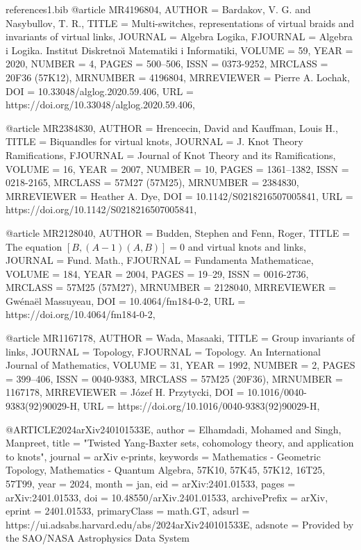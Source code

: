 \documentclass[11pt, reqno]{amsart}
\theoremstyle{definition}
\begin{document}
\begin{filecontents*}[overwrite]{references1.bib}
@article {MR4196804,
	AUTHOR = {Bardakov, V. G. and Nasybullov, T. R.},
	TITLE = {Multi-switches, representations of virtual braids and
		invariants of virtual links},
	JOURNAL = {Algebra Logika},
	FJOURNAL = {Algebra i Logika. Institut Diskretno\u{\i} Matematiki i
		Informatiki},
	VOLUME = {59},
	YEAR = {2020},
	NUMBER = {4},
	PAGES = {500--506},
	ISSN = {0373-9252},
	MRCLASS = {20F36 (57K12)},
	MRNUMBER = {4196804},
	MRREVIEWER = {Pierre A. Lochak},
	DOI = {10.33048/alglog.2020.59.406},
	URL = {https://doi.org/10.33048/alglog.2020.59.406},
}

@article {MR2384830,
    AUTHOR = {Hrencecin, David and Kauffman, Louis H.},
     TITLE = {Biquandles for virtual knots},
   JOURNAL = {J. Knot Theory Ramifications},
  FJOURNAL = {Journal of Knot Theory and its Ramifications},
    VOLUME = {16},
      YEAR = {2007},
    NUMBER = {10},
     PAGES = {1361--1382},
      ISSN = {0218-2165},
   MRCLASS = {57M27 (57M25)},
  MRNUMBER = {2384830},
MRREVIEWER = {Heather A. Dye},
       DOI = {10.1142/S0218216507005841},
       URL = {https://doi.org/10.1142/S0218216507005841},
}

@article {MR2128040,
	AUTHOR = {Budden, Stephen and Fenn, Roger},
	TITLE = {The equation {$[B,(A-1)(A,B)]=0$} and virtual knots and links},
	JOURNAL = {Fund. Math.},
	FJOURNAL = {Fundamenta Mathematicae},
	VOLUME = {184},
	YEAR = {2004},
	PAGES = {19--29},
	ISSN = {0016-2736},
	MRCLASS = {57M25 (57M27)},
	MRNUMBER = {2128040},
	MRREVIEWER = {Gw\'{e}na\"{e}l Massuyeau},
	DOI = {10.4064/fm184-0-2},
	URL = {https://doi.org/10.4064/fm184-0-2},
}

@article {MR1167178,
	AUTHOR = {Wada, Masaaki},
	TITLE = {Group invariants of links},
	JOURNAL = {Topology},
	FJOURNAL = {Topology. An International Journal of Mathematics},
	VOLUME = {31},
	YEAR = {1992},
	NUMBER = {2},
	PAGES = {399--406},
	ISSN = {0040-9383},
	MRCLASS = {57M25 (20F36)},
	MRNUMBER = {1167178},
	MRREVIEWER = {J\'{o}zef H. Przytycki},
	DOI = {10.1016/0040-9383(92)90029-H},
	URL = {https://doi.org/10.1016/0040-9383(92)90029-H},
}	


@ARTICLE{2024arXiv240101533E,
       author = {{Elhamdadi}, Mohamed and {Singh}, Manpreet},
        title = "{Twisted Yang-Baxter sets, cohomology theory, and application to knots}",
      journal = {arXiv e-prints},
     keywords = {Mathematics - Geometric Topology, Mathematics - Quantum Algebra, 57K10, 57K45, 57K12, 16T25, 57T99},
         year = 2024,
        month = jan,
          eid = {arXiv:2401.01533},
        pages = {arXiv:2401.01533},
          doi = {10.48550/arXiv.2401.01533},
archivePrefix = {arXiv},
       eprint = {2401.01533},
 primaryClass = {math.GT},
       adsurl = {https://ui.adsabs.harvard.edu/abs/2024arXiv240101533E},
      adsnote = {Provided by the SAO/NASA Astrophysics Data System}
}


\end{filecontents*}
\end{document}
